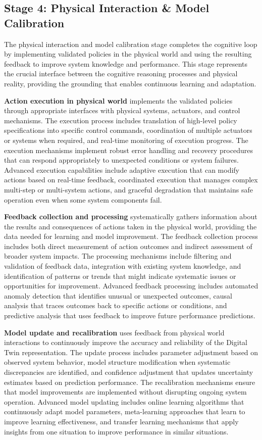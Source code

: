 \subsection{Stage 4: Physical Interaction \& Model Calibration}

The physical interaction and model calibration stage completes the cognitive loop by implementing validated policies in the physical world and using the resulting feedback to improve system knowledge and performance. This stage represents the crucial interface between the cognitive reasoning processes and physical reality, providing the grounding that enables continuous learning and adaptation.

\textbf{Action execution in physical world} implements the validated policies through appropriate interfaces with physical systems, actuators, and control mechanisms. The execution process includes translation of high-level policy specifications into specific control commands, coordination of multiple actuators or systems when required, and real-time monitoring of execution progress. The execution mechanisms implement robust error handling and recovery procedures that can respond appropriately to unexpected conditions or system failures. Advanced execution capabilities include adaptive execution that can modify actions based on real-time feedback, coordinated execution that manages complex multi-step or multi-system actions, and graceful degradation that maintains safe operation even when some system components fail.

\textbf{Feedback collection and processing} systematically gathers information about the results and consequences of actions taken in the physical world, providing the data needed for learning and model improvement. The feedback collection process includes both direct measurement of action outcomes and indirect assessment of broader system impacts. The processing mechanisms include filtering and validation of feedback data, integration with existing system knowledge, and identification of patterns or trends that might indicate systematic issues or opportunities for improvement. Advanced feedback processing includes automated anomaly detection that identifies unusual or unexpected outcomes, causal analysis that traces outcomes back to specific actions or conditions, and predictive analysis that uses feedback to improve future performance predictions.

\textbf{Model update and recalibration} uses feedback from physical world interactions to continuously improve the accuracy and reliability of the Digital Twin representation. The update process includes parameter adjustment based on observed system behavior, model structure modification when systematic discrepancies are identified, and confidence adjustment that updates uncertainty estimates based on prediction performance. The recalibration mechanisms ensure that model improvements are implemented without disrupting ongoing system operation. Advanced model updating includes online learning algorithms that continuously adapt model parameters, meta-learning approaches that learn to improve learning effectiveness, and transfer learning mechanisms that apply insights from one situation to improve performance in similar situations.

